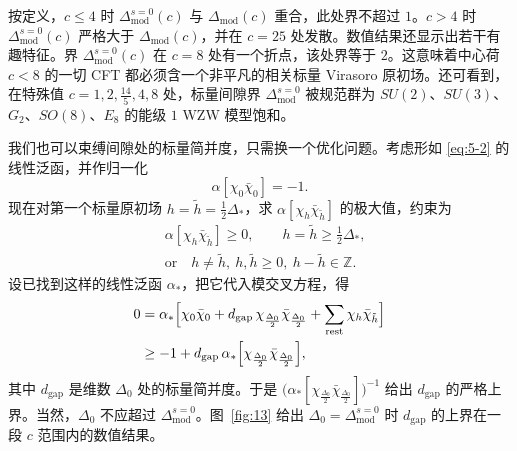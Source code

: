 按定义，$c\le4$ 时 $\Delta_{\mathrm{mod}}^{s=0}(c)$ 与 $\Delta_{\mathrm{mod}}(c)$ 重合，此处界不超过 $1$。$c>4$ 时 $\Delta_{\mathrm{mod}}^{s=0}(c)$ 严格大于 $\Delta_{\mathrm{mod}}(c)$，并在 $c=25$ 处发散。数值结果还显示出若干有趣特征。界 $\Delta_{\mathrm{mod}}^{s=0}(c)$ 在 $c=8$ 处有一个折点，该处界等于 $2$。这意味着中心荷 $c<8$ 的一切 CFT 都必须含一个非平凡的相关标量 Virasoro 原初场。还可看到，在特殊值 $c=1,2,\frac{14}{5},4,8$ 处，标量间隙界 $\Delta_{\mathrm{mod}}^{s=0}$ 被规范群为 $SU(2)$、$SU(3)$、$G_2$、$SO(8)$、$E_8$ 的能级 $1$ WZW 模型饱和。

我们也可以束缚间隙处的标量简并度，只需换一个优化问题。考虑形如 \eqref{eq:5-2} 的线性泛函，并作归一化
\begin{equation}
  \label{eq:5-9}
  \alpha[\chi_0\bar\chi_0]=-1 .
\end{equation}
现在对第一个标量原初场 $h=\tilde h=\frac12\Delta_*$，求 $\alpha[\chi_h\bar\chi_{\tilde h}]$ 的极大值，约束为
\begin{equation}
  \label{eq:5-10}
  \begin{aligned}
  &\alpha[\chi_h\bar\chi_{\tilde h}]\ge0,\qquad h=\tilde h\ge\tfrac12\Delta_*,\\
  &\text{or}\quad h\ne\tilde h,\ h,\tilde h\ge0,\ h-\tilde h\in\mathbb{Z} .
  \end{aligned}
\end{equation}
设已找到这样的线性泛函 $\alpha_*$，把它代入模交叉方程，得
\begin{equation}
  \label{eq:5-11}
  \begin{aligned}
  0&=\alpha_*\Bigl[\chi_0\bar\chi_0+d_{\mathrm{gap}}\,\chi_{\frac{\Delta_0}{2}}\bar\chi_{\frac{\Delta_0}{2}}
  +\sum_{\mathrm{rest}}\chi_h\bar\chi_{\tilde h}\Bigr]\\
  &\ge-1+d_{\mathrm{gap}}\,\alpha_*\Bigl[\chi_{\frac{\Delta_0}{2}}\bar\chi_{\frac{\Delta_0}{2}}\Bigr],
  \end{aligned}
\end{equation}
其中 $d_{\mathrm{gap}}$ 是维数 $\Delta_0$ 处的标量简并度。于是 $\bigl(\alpha_*[\chi_{\frac{\Delta_0}{2}}\bar\chi_{\frac{\Delta_0}{2}}]\bigr)^{-1}$ 给出 $d_{\mathrm{gap}}$ 的严格上界。当然，$\Delta_0$ 不应超过 $\Delta_{\mathrm{mod}}^{s=0}$。图~\ref{fig:13} 给出 $\Delta_0=\Delta_{\mathrm{mod}}^{s=0}$ 时 $d_{\mathrm{gap}}$ 的上界在一段 $c$ 范围内的数值结果。

